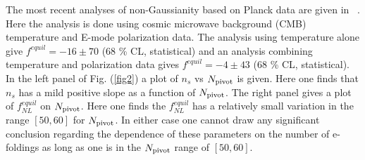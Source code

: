 \documentclass[a4paper,11pt]{article}
\begin{document}
  The most recent analyses of non-Gaussianity based on Planck data are given in ~\cite{Ade:2015ava}. 
  Here the analysis is done using cosmic microwave background (CMB) temperature and E-mode polarization 
  data. The  analysis using 
  temperature alone give $f^{equil} = -16 \pm 70$ (68 \% CL, statistical) and an analysis combining temperature and polarization data 
  gives $f^{equil} = -4 \pm 43$ (68 \% CL, statistical).
    In the left panel of Fig. (\ref{fig2})
  a plot of $n_s$ vs $N_{\rm pivot}$ is given. Here one finds that $n_s$ has a mild positive slope as a function of $N_{\rm pivot}$.
  The right panel gives a plot of $f^{equil}_{NL}$ on $N_{\rm pivot}$. Here one finds the $f^{equil}_{NL}$ has a relatively small variation in the range $[50,60]$ for
  $N_{\rm pivot}$. In either case one cannot draw any significant conclusion regarding the dependence of these parameters
  on the number of e-foldings as long as one is in the $N_{\rm pivot}$ range of $[50,60]$.

\end{document}
